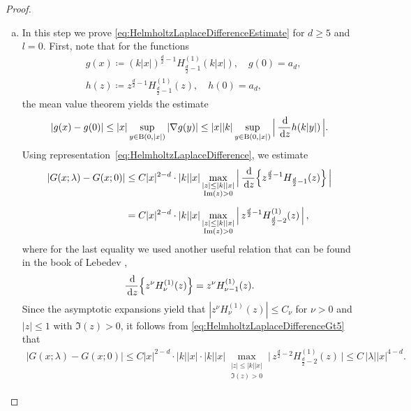 \begin{proof}
\begin{enumerate}[(a)]
  \item In this step we prove \eqref{eq:HelmholtzLaplaceDifferenceEstimate} for $d \geq 5$ and $l = 0$. 
    First, note that for the functions
    \begin{align*}
      &g(x) \coloneqq (k|x|)^{\frac{d}{2} - 1} H_{\frac{d}{2} - 1}^{(1)}(k|x|), \quad g(0) = a_d, \\
      &h(z) \coloneqq z^{\frac{d}{2} - 1} H_{\frac{d}{2} - 1}^{(1)}(z), \quad h(0) = a_d,
    \end{align*}
    the mean value theorem yields the estimate
    \begin{align*}
      |g(x) - g(0)| \leq |x| \sup_{y \in \mathrm{B}(0,|x|)} |\nabla g(y)| \leq |x| |k| \sup_{y \in \mathrm{B}(0,|x|)}  \Big| \, \frac{\, {\operatorname{d}\!{}} }{\, {\operatorname{d}\!{z}}} h (k|y|)\,\Big|.
    \end{align*}
    Using representation~\eqref{eq:HelmholtzLaplaceDifference}, we estimate
    \begin{align}
      |G(x; \lambda) - G(x; 0) |
      &\leq C |x|^{2 - d} \cdot |k| |x| \max_{\substack{|z| \leq |k| |x| \\ \operatorname{Im}(z) > 0}} \Big|\, \frac{\, {\operatorname{d}\!{}}}{\, {\operatorname{d}\!{z}}} \Big\{ z^{\frac{d}{2} - 1} H_{\frac{d}{2} - 1}(z) \Big\} \,\Big| \nonumber\\[0.5em]
      &= C |x|^{2 - d} \cdot |k| |x| \max_{\substack{|z| \leq |k||x| \\ \operatorname{Im}(z) > 0}} \Big|\,z^{\frac{d}{2} - 1} H_{\frac{d}{2} - 2}^{(1)}(z) \,\Big| \, , \label{eq:HelmholtzLaplaceDifferenceGt5}
    \end{align}
    where for the last equality we used another useful relation that can be found in the book of Lebedev \cite[Eq.\@~(5.6.3)]{lebedev},
    \begin{align}
      \frac{\, {\operatorname{d}\!{}}}{\, {\operatorname{d}\!{z}}} \Big\{ z^\nu H_\nu^{(1)}(z) \Big\} = z^\nu H_{\nu - 1}^{(1)}(z).
    \end{align}
    Since the asymptotic expansions yield that $|z^{\nu} H_\nu^{(1)}(z)| \leq C_\nu$ for $\nu > 0$ and $|z| \leq 1$ with $\Im(z) > 0$, it follows from \eqref{eq:HelmholtzLaplaceDifferenceGt5} that
    \begin{align*}
      |G(x;\lambda) - G(x; 0)| \leq C |x|^{2 - d} \cdot |k| |x| \cdot |k| |x| \max_{\substack{|z| \leq |k||x| \\ \Im(z) > 0}} \Big|\,z^{\frac{d}{2} - 2} H_{\frac{d}{2} - 2}^{(1)}(z) \, \Big|
      \leq C \, |\lambda| |x|^{4 - d}.
    \end{align*}
    

\end{enumerate}
\end{proof}

